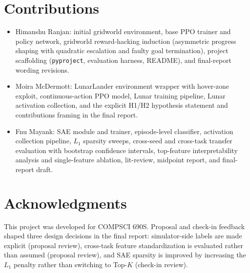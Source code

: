 \documentclass[11pt]{article}
\newcommand{\code}[1]{\texttt{#1}}
\begin{document}
\section*{Contributions}
\begin{itemize}
    \item Himanshu Ranjan: initial gridworld environment, base PPO trainer and policy network, gridworld reward-hacking induction (asymmetric progress shaping with quadratic escalation and faulty goal termination), project scaffolding (\code{pyproject}, evaluation harness, README), and final-report wording revisions.
    \item Moira McDermott: LunarLander environment wrapper with hover-zone exploit, continuous-action PPO model, Lunar training pipeline, Lunar activation collection, and the explicit H1/H2 hypothesis statement and contributions framing in the final report.
    \item Fnu Mayank: SAE module and trainer, episode-level classifier, activation collection pipeline, $L_1$ sparsity sweeps, cross-seed and cross-task transfer evaluation with bootstrap confidence intervals, top-feature interpretability analysis and single-feature ablation, lit-review, midpoint report, and final-report draft.
\end{itemize}

\section*{Acknowledgments}

This project was developed for COMPSCI 690S. Proposal and check-in feedback shaped three design decisions in the final report: simulator-side labels are made explicit (proposal review), cross-task feature standardization is evaluated rather than assumed (proposal review), and SAE sparsity is improved by increasing the $L_1$ penalty rather than switching to Top-$K$ (check-in review).
\end{document}
